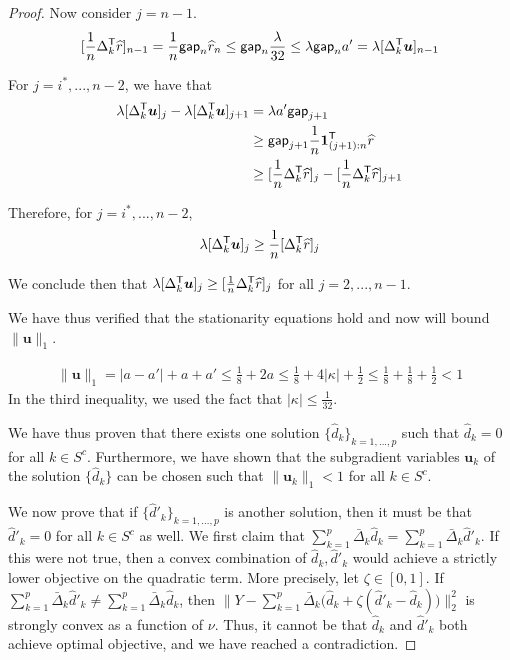 \begin{proof}
Now consider $j=n-1$. 
\[
[ \frac{1}{n} \Delta_k^{\mathsf{T}} \widehat{r} ]_{n-1} = \frac{1}{n} \mathsf{gap}_n \widehat{r}_n 
 \leq \mathsf{gap}_n \frac{\lambda }{32} \leq \lambda \mathsf{gap}_n a' = \lambda [\Delta_k^{\mathsf{T}} \mbox{\boldmath $u$}]_{n-1} 
\]

For $j = i^*, ..., n-2$, we have that 
\begin{align*}
\lambda [\Delta_k^{\mathsf{T}} \mbox{\boldmath $u$} ]_j - \lambda [\Delta_k^{\mathsf{T}} \mbox{\boldmath $u$}]_{j+1} &= 
 \lambda a' \mathsf{gap}_{j+1}  \\
 &\geq \mathsf{gap}_{j+1} \frac{1}{n} \mbox{\boldmath $1$}_{(j+1):n}^{\mathsf{T}} \widehat{r}  \\
 &\geq  [\frac{1}{n} \Delta_k^{\mathsf{T}} \widehat{r}]_j - [\frac{1}{n} \Delta_k^{\mathsf{T}} \widehat{r}]_{j+1}
\end{align*}

Therefore, for $j = i^*,...,n-2$,
\begin{align*}
\lambda [\Delta_k^{\mathsf{T}} \mbox{\boldmath $u$}]_j \geq \frac{1}{n} [ \Delta_k^{\mathsf{T}} \widehat{r}]_j
\end{align*}

We conclude then that $\lambda [\Delta_k^{\mathsf{T}} \mbox{\boldmath $u$} ]_j \geq [\frac{1}{n} \Delta_k^{\mathsf{T}} \widehat{r}]_j$ for all $j = 2,...,n-1$. 

We have thus verified that the stationarity equations hold and now will bound $\| \mathbf{u} \|_1$.

\begin{align*}
\| \mathbf{u} \|_1 = | a - a'| + a + a' \leq \frac{1}{8} + 2 a \leq \frac{1}{8} + 4 |\kappa| + \frac{1}{2}  \leq \frac{1}{8} + \frac{1}{8} + \frac{1}{2} < 1
\end{align*}
In the third inequality, we used the fact that $|\kappa| \leq \frac{1}{32}$.

We have thus proven that there exists one solution $\{ \hat{d}_k
\}_{k=1,...,p}$ such that $\hat{d}_k = 0$ for all $k \in
S^c$. Furthermore, we have shown that the subgradient variables
$\mathbf{u}_k$ of the solution $\{ \hat{d}_k \}$ can be chosen such
that $\| \mathbf{u}_k \|_1 < 1$ for all $k \in S^c$.  

We now prove that if $\{ \hat{d}'_k \}_{k = 1,..., p}$ is another
solution, then it must be that $\hat{d}'_k = 0$ for all $k \in S^c$ as
well.  We first claim that $\sum_{k=1}^p \bar{\Delta}_k \hat{d}_k =
\sum_{k=1}^p \bar{\Delta}_k \hat{d}'_k$. If this were not true, then a
convex combination of $\hat{d}_k, \hat{d}'_k$ would achieve a strictly
lower objective on the quadratic term. More precisely, let $\zeta \in
[0,1]$. If $\sum_{k=1}^p \bar{\Delta}_k \hat{d}'_k \neq \sum_{k=1}^p
\bar{\Delta}_k \hat{d}_k$, then $\| Y - \sum_{k=1}^p \bar{\Delta}_k
\big( \hat{d}_k + \zeta ( \hat{d}'_k - \hat{d}_k) \big) \|_2^2$ is
strongly convex as a function of $\nu$. Thus, it cannot be that
$\hat{d}_k$ and $\hat{d}'_k$ both achieve optimal objective, and we
have reached a contradiction.


\end{proof}
